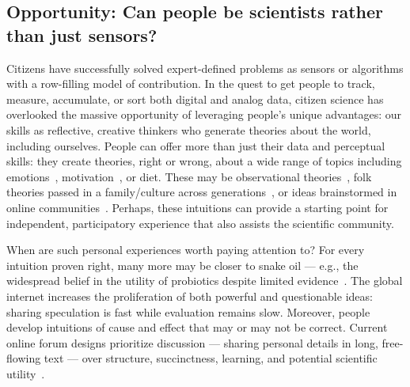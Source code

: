 
\subsection{Opportunity: Can people be scientists rather than just sensors?}
Citizens have successfully solved expert-defined problems as sensors or algorithms with a 
row-filling model of contribution.
In the quest to get people to track, measure, accumulate, or
sort both digital and analog data, citizen science has overlooked the massive 
opportunity of leveraging people’s unique advantages: our skills as reflective, 
creative thinkers who generate theories about the world, including ourselves.
People can offer more than just their data and perceptual
skills: they create theories, right or wrong, about a wide
range of topics including emotions~\cite{Johnson-Laird1992a}, motivation~\cite{Markus1991}, or
diet. These may be observational theories~\cite{Kempton1986}, folk theories
passed in a family/culture across generations~\cite{Gelman2011}, or ideas
brainstormed in online communities~\cite{23andme2016}. Perhaps, these intuitions 
can provide a starting point for independent, participatory experience that also assists the scientific community.

When are such personal experiences worth paying attention
to? For every intuition proven right, many more may be
closer to snake oil — e.g., the widespread belief in the utility
of probiotics despite limited evidence~\cite{Bonifait2009}. The global internet
increases the proliferation of both powerful and questionable
ideas: sharing speculation is fast while evaluation remains
slow. Moreover, people develop intuitions of cause and effect
that may or may not be correct. Current online forum
designs prioritize discussion — sharing personal details in
long, free-flowing text — over structure, succinctness, learning,
and potential scientific utility~\cite{Thomas2002}.

